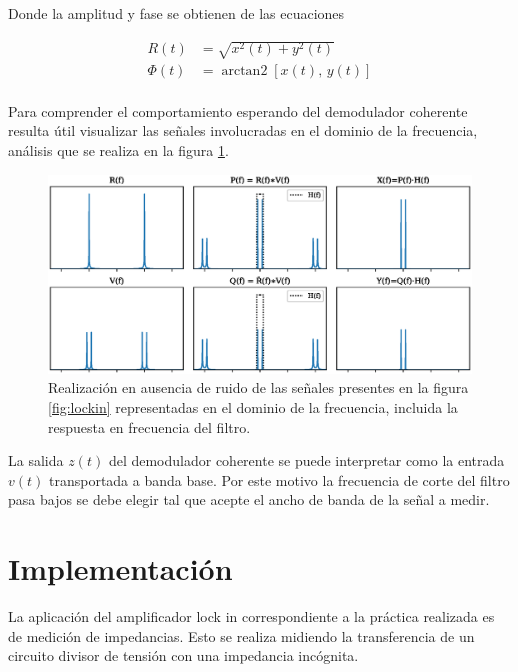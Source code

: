 \documentclass[11pt,a4paper]{extarticle}
\DeclareMathOperator{\arctantwo}{arctan2}
\begin{document}
\begin{multicols}{2}
Donde la amplitud y fase se obtienen de las ecuaciones

\begin{equation}\label{eq:ampfase}
	\begin{aligned}
		R(t) &= \sqrt{x^2(t)+y^2(t)}\\[0.5em]
		\Phi(t) &= \arctantwo\left[x(t), \, y(t)\right]
	\end{aligned}
\end{equation}\\[-1em]

Para comprender el comportamiento esperando del demodulador coherente resulta útil visualizar las señales involucradas en el dominio de la frecuencia, análisis que se realiza en la figura \ref{fig:sigs_fourier}.

\begin{figure}[H]
	\centering
	\includegraphics[width=\linewidth]{Images/sigs_fourier.eps}
	\caption{Realización en ausencia de ruido de las señales presentes en la figura \ref{fig:lockin} representadas en el dominio de la frecuencia, incluida la respuesta en frecuencia del filtro.}
	\label{fig:sigs_fourier}
\end{figure}

La salida $z(t)$ del demodulador coherente se puede interpretar como la entrada $v(t)$ transportada a banda base. Por este motivo la frecuencia de corte del filtro pasa bajos se debe elegir tal que acepte el ancho de banda de la señal a medir.

\section{Implementación}

La aplicación del amplificador lock in correspondiente a la práctica realizada es de medición de impedancias. Esto se realiza midiendo la transferencia de un circuito divisor de tensión con una impedancia incógnita.


\end{multicols}
\end{document}

